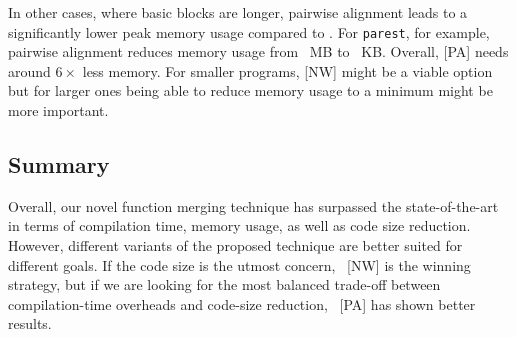 In other cases, where basic blocks are longer, pairwise alignment leads to a significantly lower peak memory usage compared to {\NW}. For \texttt{parest}, for example, pairwise alignment reduces memory usage from ~MB to ~KB. Overall, {[PA]} needs around $6\times$ less memory. For smaller programs, {[NW]} might be a viable option but for larger ones being able to reduce memory usage to a minimum might be more important.

\subsection{Summary}
Overall, our novel function merging technique has surpassed the state-of-the-art in terms of compilation time, memory usage, as well as code size reduction.
However, different variants of the proposed technique are better suited for different goals.
If the code size is the utmost concern, {\ProjName}~[NW] is the winning strategy, but if we are looking for the most balanced trade-off between compilation-time overheads and code-size reduction, {\ProjName}~[PA] has shown better results.
